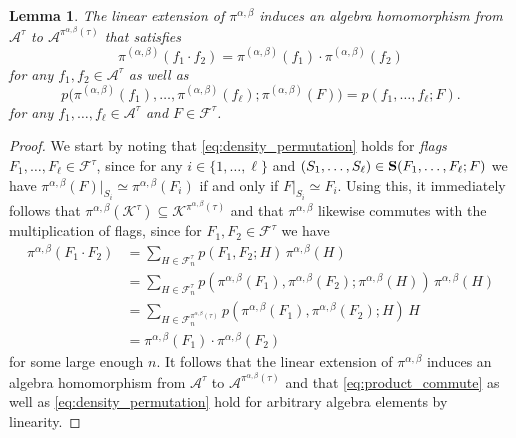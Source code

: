 \documentclass[a4paper,11pt]{article}
\newtheorem{lemma}[theorem]{Lemma}
\numberwithin{equation}{section}
\newcommand{\mA}{\mathcal{A}}
\newcommand{\mK}{\mathcal{K}}
\newcommand{\mF}{\mathcal{F}}
\begin{document}
\begin{lemma}\label{lemma:extend_color_vertex_permutations}
    The linear extension of $\pi^{\alpha, \beta}$ induces an algebra homomorphism from $\mA^\tau$ to $\mA^{\pi^{\alpha,\beta}(\tau)}$ that satisfies
    \begin{equation} \label{eq:product_commute}
        \pi^{(\alpha,\beta)}(f_1 \cdot f_2) = \pi^{(\alpha,\beta)}(f_1) \cdot \pi^{(\alpha,\beta)}(f_2)
    \end{equation}
    for any $f_1, f_2 \in \mA^\tau$ as well as
    \begin{equation} \label{eq:density_permutation}
        p \big( \pi^{(\alpha,\beta)}(f_1), \ldots, \pi^{(\alpha,\beta)}(f_\ell); \pi^{(\alpha,\beta)}(F) \big) = p(f_1, \ldots, f_\ell; F).
    \end{equation}
    for any $f_1, \ldots, f_\ell \in \mA^\tau$ and $F \in \mF^\tau$.
\end{lemma}
%
\begin{proof}
    We start by noting that \cref{eq:density_permutation} holds for \emph{flags} $F_1, \ldots, F_\ell \in \mF^\tau$,
    since for any $i\in \{1,\dots,\ell\}$ and $(S_1, \ldots, S_\ell) \in {\bf S}(F_1, \ldots, F_\ell; F)$ we have $\pi^{\alpha,\beta}(F)\vert_{S_i} \simeq \pi^{\alpha,\beta}(F_i)$ if and only if $F\vert_{S_i} \simeq F_i$. 
    Using this, it immediately follows that $\pi^{\alpha,\beta}(\mK^\tau) \subseteq \mK^{\pi^{\alpha,\beta}(\tau)}$ and that $\pi^{\alpha,\beta}$ likewise commutes with the multiplication of flags, since for $F_1, F_2\in\mF^\tau$ we have
    \begin{align*}
        \pi^{\alpha,\beta}(F_1\cdot F_2) & = \sum_{H\in\mF_n^\tau} p(F_1,F_2;H) \, \pi^{\alpha,\beta}(H) \\
        & = \sum_{H\in\mF_n^\tau} p(\pi^{\alpha,\beta}(F_1),\pi^{\alpha,\beta}(F_2);\pi^{\alpha,\beta}(H)) \, \pi^{\alpha,\beta}(H) \\
        & = \sum_{H \in \mF_n^{\pi^{\alpha, \beta}(\tau)}}  p(\pi^{\alpha,\beta}(F_1),\pi^{\alpha,\beta}(F_2);H) \, H \\
        & = \pi^{\alpha,\beta}(F_1)\cdot\pi^{\alpha,\beta}(F_2)
    \end{align*}
    for some large enough $n$. It follows that the linear extension of $\pi^{\alpha,\beta}$ induces an algebra homomorphism from $\mA^\tau$ to $\mA^{\pi^{\alpha,\beta}(\tau)}$ and that \cref{eq:product_commute} as well as \cref{eq:density_permutation} hold for arbitrary algebra elements by linearity.
\end{proof}
\end{document}

